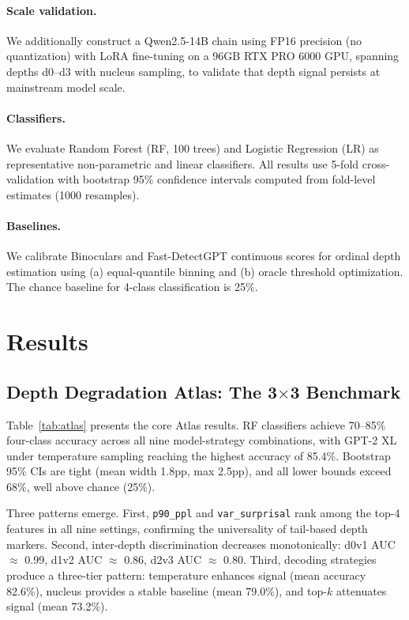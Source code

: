 \documentclass[11pt,a4paper]{article}
\begin{document}
\paragraph{Scale validation.}
We additionally construct a Qwen2.5-14B chain using FP16 precision (no quantization) with LoRA fine-tuning on a 96GB RTX PRO 6000 GPU, spanning depths d0--d3 with nucleus sampling, to validate that depth signal persists at mainstream model scale.

\paragraph{Classifiers.}
We evaluate Random Forest (RF, 100 trees) and Logistic Regression (LR) as representative non-parametric and linear classifiers. All results use 5-fold cross-validation with bootstrap 95\% confidence intervals computed from fold-level estimates (1000 resamples).

\paragraph{Baselines.}
We calibrate Binoculars \citep{hans2024binoculars} and Fast-DetectGPT \citep{bao2024fastdetectgpt} continuous scores for ordinal depth estimation using (a) equal-quantile binning and (b) oracle threshold optimization. The chance baseline for 4-class classification is 25\%.

\section{Results}
\label{sec:results}

\subsection{Depth Degradation Atlas: The 3$\times$3 Benchmark}

Table~\ref{tab:atlas} presents the core Atlas results. RF classifiers achieve 70--85\% four-class accuracy across all nine model-strategy combinations, with GPT-2 XL under temperature sampling reaching the highest accuracy of 85.4\%. Bootstrap 95\% CIs are tight (mean width 1.8pp, max 2.5pp), and all lower bounds exceed 68\%, well above chance (25\%).

Three patterns emerge. First, \texttt{p90\_ppl} and \texttt{var\_surprisal} rank among the top-4 features in all nine settings, confirming the universality of tail-based depth markers. Second, inter-depth discrimination decreases monotonically: d0v1 AUC $\approx$ 0.99, d1v2 AUC $\approx$ 0.86, d2v3 AUC $\approx$ 0.80. Third, decoding strategies produce a three-tier pattern: temperature enhances signal (mean accuracy 82.6\%), nucleus provides a stable baseline (mean 79.0\%), and top-$k$ attenuates signal (mean 73.2\%).
\end{document}

